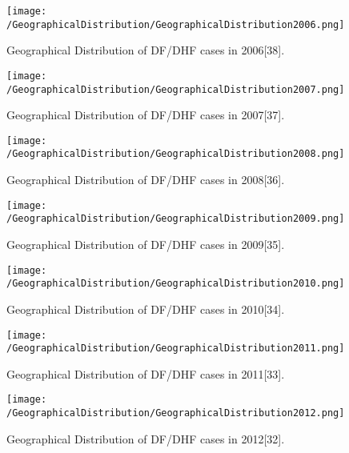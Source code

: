 \documentclass[11pt]{exam}
\begin{document}
\begin{questions}
\begin{enumerate}
\begin{figure}[H]
  \centering
   \texttt{[image: /GeographicalDistribution/GeographicalDistribution2006.png]} 
  \caption{Geographical Distribution of DF/DHF cases in 2006[38].}
   \label{Geographical Distribution of DF/DHF Clusters}
\end{figure} 

\begin{figure}[H]
  \centering
   \texttt{[image: /GeographicalDistribution/GeographicalDistribution2007.png]} 
  \caption{Geographical Distribution of DF/DHF cases in 2007[37].}
   \label{Geographical Distribution of DF/DHF Clusters}
\end{figure} 

\begin{figure}[H]
  \centering
   \texttt{[image: /GeographicalDistribution/GeographicalDistribution2008.png]} 
  \caption{Geographical Distribution of DF/DHF cases in 2008[36].}
   \label{Geographical Distribution of DF/DHF Clusters}
\end{figure} 

\begin{figure}[H]
  \centering
   \texttt{[image: /GeographicalDistribution/GeographicalDistribution2009.png]} 
  \caption{Geographical Distribution of DF/DHF cases in 2009[35].}
   \label{Geographical Distribution of DF/DHF Clusters}
\end{figure} 

\begin{figure}[H]
  \centering
   \texttt{[image: /GeographicalDistribution/GeographicalDistribution2010.png]} 
  \caption{Geographical Distribution of DF/DHF cases in 2010[34].}
   \label{Geographical Distribution of DF/DHF Clusters}
\end{figure} 

\begin{figure}[H]
  \centering
   \texttt{[image: /GeographicalDistribution/GeographicalDistribution2011.png]} 
  \caption{Geographical Distribution of DF/DHF cases in 2011[33].}
   \label{Geographical Distribution of DF/DHF Clusters}
\end{figure} 

\begin{figure}[H]
  \centering
   \texttt{[image: /GeographicalDistribution/GeographicalDistribution2012.png]} 
  \caption{Geographical Distribution of DF/DHF cases in 2012[32].}
   \label{Geographical Distribution of DF/DHF Clusters}
\end{figure} 


\end{enumerate}
\end{questions}
\end{document}
